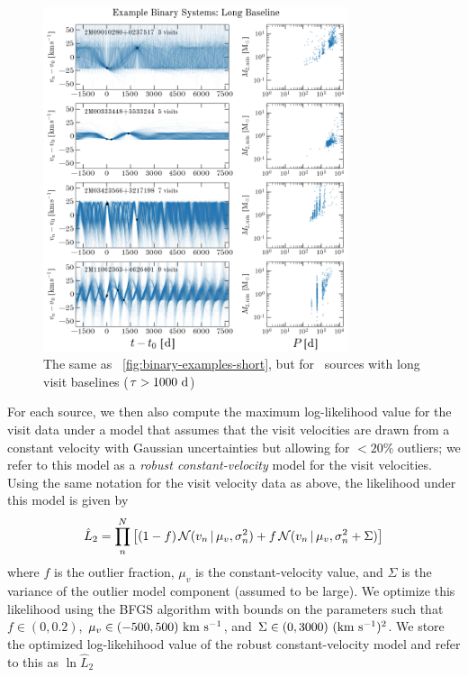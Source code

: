 \documentclass[modern]{aastex63}
\begin{document}
\begin{figure}[!t]
    \begin{center}
    \includegraphics[width=0.8\textwidth]{example-binaries-long-placeholder.png}
    \end{center}
    \caption{%
    The same as \figurename~\ref{fig:binary-examples-short}, but for \apogee\
    sources with long visit baselines ($\tau > 1000~\mathrm{d}$)
    \label{fig:binary-examples-long}
    }
\end{figure}

For each source, we then also compute the maximum log-likelihood value for the
visit data under a model that assumes that the visit velocities are drawn from a
constant velocity with Gaussian uncertainties but allowing for $<20\%$ outliers;
we refer to this model as a \emph{robust constant-velocity} model for the visit
velocities.
Using the same notation for the visit velocity data as above, the likelihood
under this model is given by
\begin{equation}
    \hat{L}_2 = \prod_n^N \left[(1-f) \,
        \mathcal{N}(v_n \given \mu_v, \sigma_n^2)
        + f\, \mathcal{N}(v_n \given \mu_v, \sigma_n^2 + \Sigma) \right]
\end{equation}
where $f$ is the outlier fraction, $\mu_v$ is the constant-velocity value, and
$\Sigma$ is the variance of the outlier model component (assumed to be large).
We optimize this likelihood using the BFGS algorithm \citep{Nocedal:2006} with
bounds on the parameters such that $f \in (0, 0.2)$, $\mu_v \in (-500,
500)~\mathrm{km}~\mathrm{s}^{-1}$, and $\Sigma \in (0, 3000)~(\mathrm{km}~\mathrm{s}^{-1})^2$.
We store the optimized log-likehihood value of the robust constant-velocity
model and refer to this as $\ln \hat{L}_2$
\end{document}
